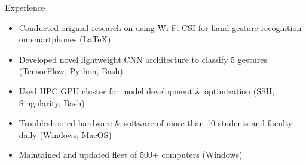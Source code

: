 \documentclass{resume} %
\begin{document}
\begin{workSection}{Experience}
    \experienceItem[
    company=Temple University,
    location=Philadelphia{,} PA,
    position=Undergraduate Researcher,
    duration=June – July 2023
    ]
    \begin{itemize}
        \itemsep -6pt {}
        \item Conducted original research on using Wi-Fi CSI for hand gesture recognition on smartphones (LaTeX)
        \item Developed novel lightweight CNN architecture to classify 5 gestures (TensorFlow, Python, Bash)
        \item Used HPC GPU cluster for model development \& optimization (SSH, Singularity, Bash)
    \end{itemize}

    \experienceItem[
    company=UTEP,
    location=El Paso{,} TX,
    position=Computer Lab Assistant,
    duration=January {-} May 2023
    ]
    \begin{itemize}
        \itemsep -6pt {}
        \item Troubleshooted hardware \& software of more than 10 students and faculty daily (Windows, MacOS)
        \item Maintained and updated fleet of 500+ computers (Windows)
    \end{itemize}

\end{workSection}
\end{document}
